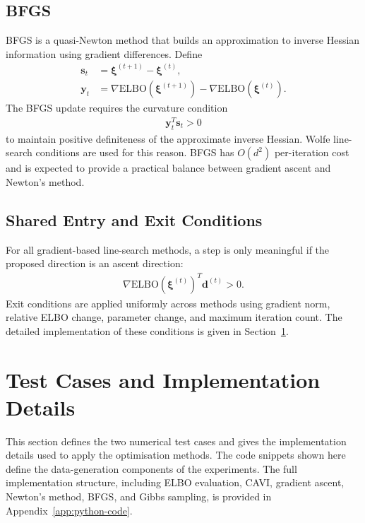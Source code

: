 \documentclass[11pt,a4paper]{article}
\newcommand{\ELBO}{\text{ELBO}}
\begin{document}
\subsection{BFGS}

BFGS is a quasi-Newton method that builds an approximation to inverse Hessian information using gradient differences. Define
\begin{align}
\bm{s}_t &= \bm{\xi}^{(t+1)} - \bm{\xi}^{(t)},\\
\bm{y}_t &= \nabla\ELBO(\bm{\xi}^{(t+1)}) - \nabla\ELBO(\bm{\xi}^{(t)}).
\end{align}
The BFGS update requires the curvature condition
\begin{align}
\bm{y}_t^T\bm{s}_t > 0
\end{align}
to maintain positive definiteness of the approximate inverse Hessian. Wolfe line-search conditions are used for this reason. BFGS has $O(d^2)$ per-iteration cost and is expected to provide a practical balance between gradient ascent and Newton's method.

\subsection{Shared Entry and Exit Conditions}

For all gradient-based line-search methods, a step is only meaningful if the proposed direction is an ascent direction:
\begin{align}
\nabla\ELBO(\bm{\xi}^{(t)})^T\bm{d}^{(t)} > 0.
\end{align}
Exit conditions are applied uniformly across methods using gradient norm, relative ELBO change, parameter change, and maximum iteration count. The detailed implementation of these conditions is given in Section~\ref{sec:implementation-details}.

\section{Test Cases and Implementation Details}
\label{sec:implementation-details}

This section defines the two numerical test cases and gives the implementation details used to apply the optimisation methods. The code snippets shown here define the data-generation components of the experiments. The full implementation structure, including ELBO evaluation, CAVI, gradient ascent, Newton's method, BFGS, and Gibbs sampling, is provided in Appendix~\ref{app:python-code}.
\end{document}
